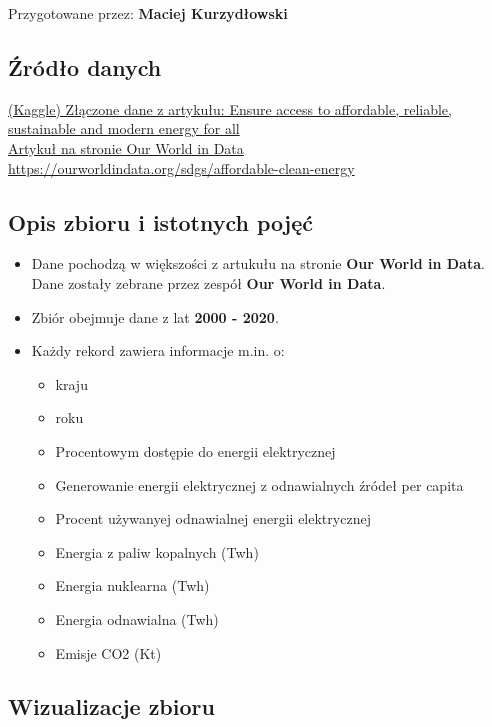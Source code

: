 \documentclass[12pt]{article}
\begin{document}
Przygotowane przez: \textbf{Maciej Kurzydłowski}

\subsection{Źródło danych}
\href{https://www.kaggle.com/datasets/anshtanwar/global-data-on-sustainable-energy}{(Kaggle) Złączone dane z artykułu: Ensure access to affordable, reliable, sustainable and modern energy for all}\\
\href{https://ourworldindata.org/sdgs/affordable-clean-energy}{Artykuł na stronie Our World in Data}\\
\url{https://ourworldindata.org/sdgs/affordable-clean-energy}

\subsection{Opis zbioru i istotnych pojęć}
\begin{itemize}
    \item Dane pochodzą w większości z artukułu na stronie \textbf{Our World in Data}. Dane zostały zebrane przez zespół \textbf{Our World in Data}.
    
    \item Zbiór obejmuje dane z lat \textbf{2000 - 2020}.
    
    \item Każdy rekord zawiera informacje m.in. o:
    \begin{itemize}
        \item kraju
        \item roku
        \item Procentowym dostępie do energii elektrycznej
        \item Generowanie energii elektrycznej z odnawialnych źródeł per capita
        \item Procent używanyej odnawialnej energii elektrycznej
        \item Energia z paliw kopalnych (Twh)
        \item Energia nuklearna (Twh)
        \item Energia odnawialna (Twh)
        \item Emisje CO2 (Kt)
    \end{itemize}
\end{itemize}

\newpage
\subsection{Wizualizacje zbioru}
\end{document}
